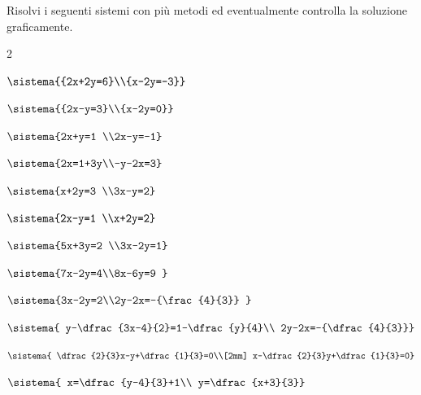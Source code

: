 \begin{esercizio}[*]
 \label{ese:22.67}
 Risolvi i seguenti sistemi con più metodi ed eventualmente controlla
la soluzione graficamente.
\begin{htmulticols}{2}
\begin{enumeratea}
\item \(\sistema{{2x+2y=6}\\{x-2y=-3}}\)
\item \(\sistema{{2x-y=3}\\{x-2y=0}}\)
\item \(\sistema{2x+y=1 \\2x-y=-1}\)
\item \(\sistema{2x=1+3y\\-y-2x=3}\)
\item \(\sistema{x+2y=3 \\3x-y=2}\)
\item \(\sistema{2x-y=1 \\x+2y=2}\)
\item \(\sistema{5x+3y=2 \\3x-2y=1}\)
\item \(\sistema{7x-2y=4\\8x-6y=9 }\)
\item \(\sistema{3x-2y=2\\2y-2x=-{\frac{4}{3}} 
}\)
\item \(\sistema{
y-\dfrac{3x-4}{2}=1-\dfrac{y}{4}\\
2y-2x=-{\dfrac{4}{3}}}\)
\item \(\sistema{
\dfrac{2}{3}x-y+\dfrac{1}{3}=0\\[2mm]
x-\dfrac{2}{3}y+\dfrac{1}{3}=0}\)
\item \(\sistema{
x=\dfrac{y-4}{3}+1\\
y=\dfrac{x+3}{3}}\)
\end{enumeratea}
\end{htmulticols}
\end{esercizio}

